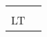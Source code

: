 \documentclass{standalone}
\begin{document}
\setlength\tabcolsep{0pt}

\begin{tabular}{cc}%
\vspace{-9pt}&\\
\Large{LT}&
\end{tabular}



 
\end{document}
